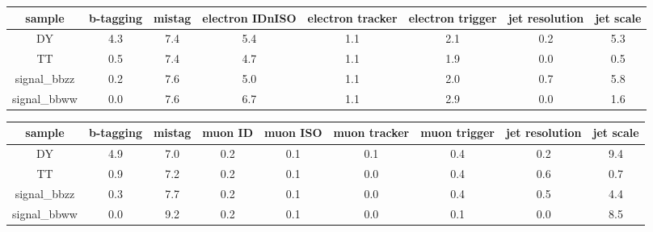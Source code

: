 \begin{sidewaystable}
\begin{center}
\caption{Yield variations, ee channel, 300 GeV.}
\begin{tabular}{ | c | c | c | c | c | c |c | c | } \hline
 sample & b-tagging &  mistag &  electron IDnISO &  electron tracker &  electron trigger &  jet resolution &  jet scale \\\hline
  DY &              4.3 &     7.4 &              5.4 &               1.1 &               2.1 &             0.2 &        5.3 \\
  TT &              0.5 &     7.4 &              4.7 &               1.1 &               1.9 &             0.0 &        0.5 \\
  signal\_bbzz &    0.2 &     7.6 &              5.0 &               1.1 &               2.0 &             0.7 &        5.8 \\
  signal\_bbww &    0.0 &     7.6 &              6.7 &               1.1 &               2.9 &             0.0 &        1.6 \\\hline
\end{tabular}
\label{normalization_electron}
\end{center}
\begin{center}
\caption{Yield variations, mm channel, 300 GeV.}
\begin{tabular}{ | c | c | c | c| c | c | c | c| c |}\hline
sample &  b-tagging &  mistag &  muon ID &  muon ISO &  muon tracker &  muon trigger &  jet resolution &  jet scale \\\hline
  DY &              4.9 &     7.0 &      0.2 &       0.1 &           0.1 &           0.4 &             0.2 &        9.4 \\
  TT &              0.9 &     7.2 &      0.2 &       0.1 &           0.0 &           0.4 &             0.6 &        0.7 \\
  signal\_bbzz &    0.3 &     7.7 &      0.2 &       0.1 &           0.0 &           0.4 &             0.5 &        4.4 \\
  signal\_bbww &    0.0 &     9.2 &      0.2 &       0.1 &           0.0 &           0.1 &             0.0 &        8.5 \\\hline
\end{tabular}
\label{yieldVariations}
\end{center}
\end{sidewaystable}







